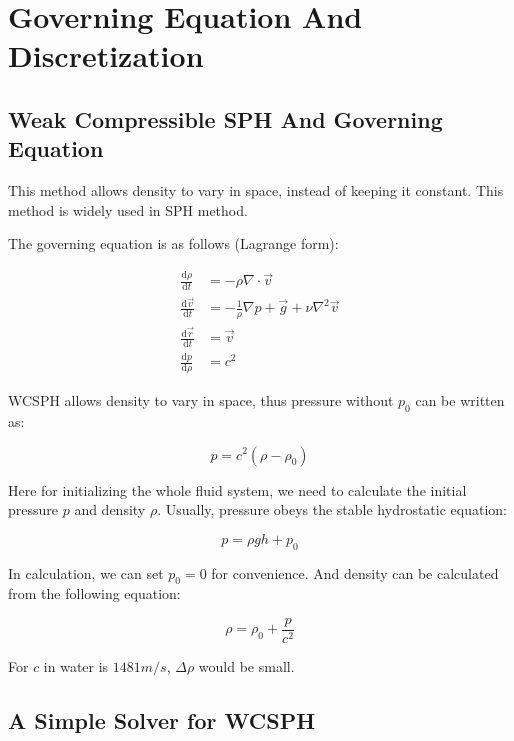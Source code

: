 \documentclass[10pt, oneside]{article}
\begin{document}
\section{Governing Equation And Discretization}

\subsection{Weak Compressible SPH And Governing Equation}

This method allows density to vary in space, instead of keeping it constant. 
This method is widely used in SPH method.

The governing equation is as follows (Lagrange form):

\begin{equation}
    \begin{aligned}
        \frac{\mathrm{d} \rho}{\mathrm{d} t} &= -\rho \nabla\cdot \vec{v}\\
        \frac{\mathrm{d} \vec{v}}{\mathrm{d} t} &= -\frac{1}{\rho}\nabla p + \vec{g} + \nu \nabla^2 \vec{v}\\
        \frac{\mathrm{d} \vec{r}}{\mathrm{d} t} &= \vec{v}\\
        \frac{\mathrm{d}p}{\mathrm{d} \rho} &= c^2
    \end{aligned}
\end{equation}

WCSPH allows density to vary in space, thus pressure without $p_0$ can be written as:

\begin{equation}
    p = c^2(\rho - \rho_0)
\end{equation}

Here for initializing the whole fluid system, 
we need to calculate the initial pressure $p$ and density $\rho$.
Usually, pressure obeys the stable hydrostatic equation:

\begin{equation}
    p = \rho g h+ p_0
\end{equation}

In calculation, we can set $p_0=0$ for convenience. 
And density can be calculated from the following equation:

\begin{equation}
    \rho = \rho_0 + \frac{p}{c^2}
\end{equation}

For $c$ in water is $1481m/s$, $\Delta\rho$ would be small.

\subsection{A Simple Solver for WCSPH}
\end{document}
